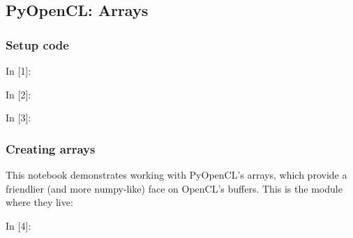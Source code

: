 
    \hypertarget{pyopencl-arrays}{%
\subsection{PyOpenCL: Arrays}\label{pyopencl-arrays}}

    \hypertarget{setup-code}{%
\subsubsection{Setup code}\label{setup-code}}

    \begin{BGVerbatim}[commandchars=\\\{\}]
{\color{incolor}In [{\color{incolor}1}]:}    
           
           
\end{BGVerbatim}

    \begin{BGVerbatim}[commandchars=\\\{\}]
{\color{incolor}In [{\color{incolor}2}]:}    
\end{BGVerbatim}

    \begin{BGVerbatim}[commandchars=\\\{\}]
{\color{incolor}In [{\color{incolor}3}]:}   
          
\end{BGVerbatim}

    \hypertarget{creating-arrays}{%
\subsubsection{Creating arrays}\label{creating-arrays}}

    This notebook demonstrates working with PyOpenCL's arrays, which provide
a friendlier (and more numpy-like) face on OpenCL's buffers. This is the
module where they live:

    \begin{BGVerbatim}[commandchars=\\\{\}]
{\color{incolor}In [{\color{incolor}4}]:}  
\end{BGVerbatim}

